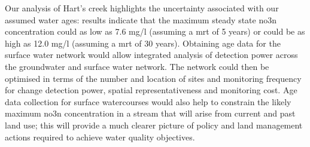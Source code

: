 Our analysis of Hart's creek highlights the uncertainty associated with our assumed water ages: results indicate that the maximum steady state \gls{no3n} concentration could as low as 7.6 mg/l (assuming a \gls{mrt} of 5 years) or could be as high as 12.0 mg/l (assuming a \gls{mrt} of 30 years).
Obtaining age data for the surface water network would allow integrated analysis of detection power across the groundwater and surface water network.
The network could then be optimised in terms of the number and location of sites and monitoring frequency for change detection power, spatial representativeness and monitoring cost.
Age data collection for surface watercourses would also help to constrain the likely maximum \gls{no3n} concentration in a stream that will arise from current and past land use; this will provide a much clearer picture of policy and land management actions required to achieve water quality objectives.

